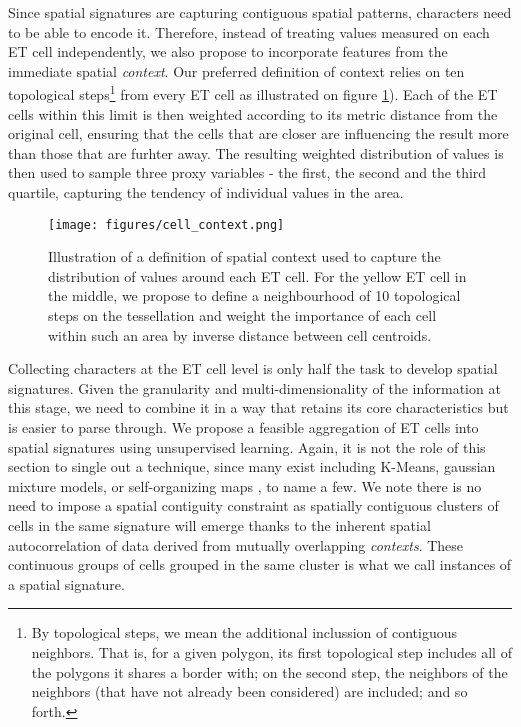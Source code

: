 Since spatial signatures are capturing contiguous spatial patterns, characters need to
be able to encode it. Therefore, instead of treating values measured on each ET cell
independently, we also propose to incorporate features from the immediate spatial \textit{context}.
Our preferred definition of context relies on ten topological steps\footnote{By topological steps,
we mean the additional inclussion of
contiguous neighbors. That is, for a given polygon, its first topological step
includes all of the polygons it shares a border with; on the second step, the
neighbors of the neighbors (that have not already been considered) are
included; and so forth.} from every ET cell
as illustrated on figure \ref{fig:context}). Each of the ET
cells within this limit is then weighted according to its metric distance from the
original cell, ensuring that the cells that are closer are influencing the result more
than those that are furhter away. The resulting weighted distribution of values is then
used to sample three proxy variables - the first, the second and the third quartile,
capturing the tendency of individual values in the area.

\begin{figure}
\texttt{[image: figures/cell\_context.png]}
\caption{Illustration of a definition of spatial context used to capture the
distribution of values around each ET cell. For the yellow ET cell in the middle,
we propose to define a neighbourhood of 10 topological
steps on the tessellation
and weight the importance of each cell within such an area by inverse distance between cell
centroids.}
\label{fig:context}
\end{figure}


Collecting characters at the ET cell level is only half the task to develop
spatial signatures. Given the granularity and multi-dimensionality of the
information at this stage, we need to combine it in a way that retains its
core characteristics but is easier to parse through.
%
We propose a feasible aggregation of ET cells into
spatial signatures using unsupervised learning. Again, it is not the role of
this section to single out a technique, since many exist including K-Means,
gaussian mixture models, or self-organizing maps \citep{kohonen1990self}, to
name a few. We note there is no need to impose a spatial contiguity constraint
as spatially contiguous clusters of cells in the same signature will emerge
thanks to the inherent spatial autocorrelation of data derived from mutually
overlapping \textit{contexts}.
%
These continuous groups of cells grouped in the same cluster is what we call
instances of a spatial signature.
